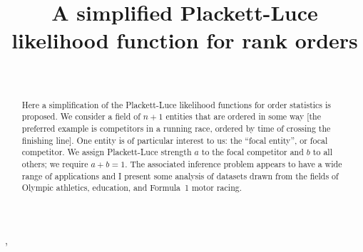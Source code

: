 \documentclass[ejs,noshowframe]{imsart}
\theoremstyle{plain}
\theoremstyle{definition}
\theoremstyle{remark}
\begin{document}
\begin{frontmatter}
\title{A simplified Plackett-Luce likelihood function for rank orders}

\begin{aug}
\author[A]{~},
\address[A]{Computer Science and Mathematics,
University of Stirling}

\end{aug}

\begin{abstract}
Here a simplification of the Plackett-Luce likelihood functions for
order statistics is proposed.  We consider a field of $n+1$ entities
that are ordered in some way [the preferred example is competitors in
  a running race, ordered by time of crossing the finishing line].
One entity is of particular interest to us: the ``focal entity'', or
focal competitor.  We assign Plackett-Luce strength $a$ to the focal
competitor and $b$ to all others; we require $a+b=1$.  The associated
inference problem appears to have a wide range of applications and I
present some analysis of datasets drawn from the fields of Olympic
athletics, education, and Formula~1 motor racing.
\end{abstract}

\begin{keyword}[class=MSC]
\end{keyword}


\end{frontmatter}
\end{document}
